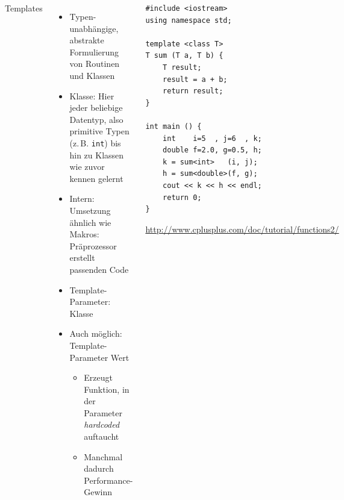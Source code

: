 \begin{frame}[fragile]
%
\begin{columns}[T]
\begin{Large}
{Templates}
\vspace{10pt}
\end{Large}
\begin{itemize}
\item Typen-unabhängige, abstrakte Formulierung von Routinen und Klassen
\item Klasse: Hier jeder beliebige Datentyp, also primitive Typen (z.\,B. \texttt{int}) bis hin zu
	Klassen wie zuvor kennen gelernt
\item Intern: Umsetzung ähnlich wie Makros: Präprozessor erstellt passenden Code
\item Template-Parameter: Klasse
\item Auch möglich: Template-Parameter Wert
	\begin{itemize}
	\item Erzeugt Funktion, in der Parameter \emph{hardcoded} auftaucht
	\item Manchmal dadurch Performance-Gewinn
	\end{itemize}
\end{itemize}
%
\begin{codebox}
\begin{verbatim}
#include <iostream>
using namespace std;

template <class T>
T sum (T a, T b) {
    T result;
    result = a + b;
    return result;
}

int main () {
    int    i=5  , j=6  , k;
    double f=2.0, g=0.5, h;
    k = sum<int>   (i, j);
    h = sum<double>(f, g);
    cout << k << h << endl;
    return 0;
}
\end{verbatim}
\tiny \url{http://www.cplusplus.com/doc/tutorial/functions2/}
\end{codebox}
\end{columns}
%
\end{frame}


